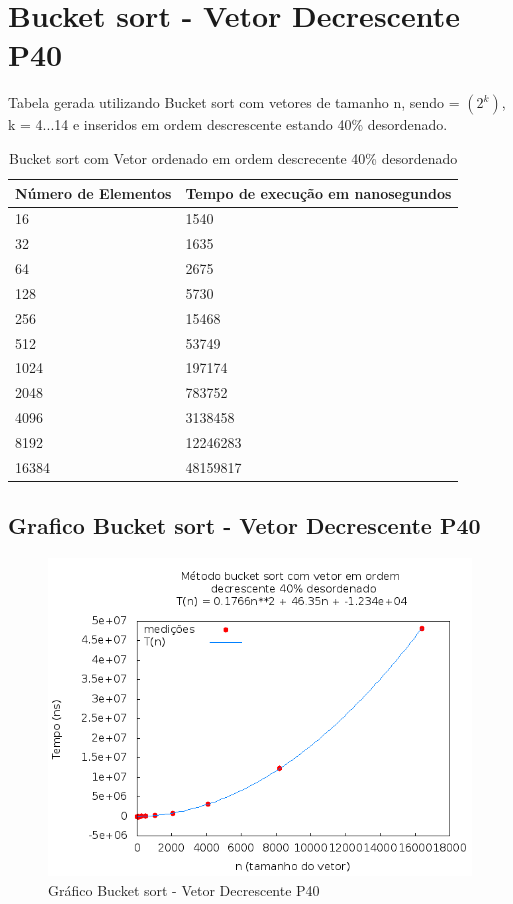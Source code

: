 \documentclass[12pt,a4paper,twoside]{report}
\begin{document}
\section{Bucket sort - Vetor Decrescente P40}
Tabela gerada utilizando Bucket sort com vetores de tamanho n, sendo = $(2^k)$, k = 4...14 e inseridos em ordem descrescente estando 40\% desordenado.

\begin{table}[H]
\centering
\caption{Bucket sort com Vetor ordenado em ordem descrecente 40\% desordenado}
\label{my-label}
\begin{tabular}{|l|l|}
\hline
\multicolumn{1}{|c|}{\textbf{Número de Elementos}} & \multicolumn{1}{c|}{\textbf{Tempo de execução em nanosegundos}} \\ \hline
16 & 1540 \\ \hline
32 & 1635 \\ \hline
64 & 2675 \\ \hline
128 & 5730 \\ \hline
256 & 15468 \\ \hline
512 & 53749 \\ \hline
1024 & 197174 \\ \hline
2048 & 783752 \\ \hline
4096 & 3138458 \\ \hline
8192 & 12246283 \\ \hline
16384 & 48159817 \\ \hline
\end{tabular}
\end{table}

\subsection{Grafico Bucket sort - Vetor Decrescente P40}
\begin{figure}[H]
    \centering
    \includegraphics[width=0.7\linewidth]{graficos/Bucket/vIntDecrescenteP40/vIntDecrescenteP40.png}
  \caption{Gráfico Bucket sort - Vetor Decrescente P40}
\end{figure}
\end{document}
